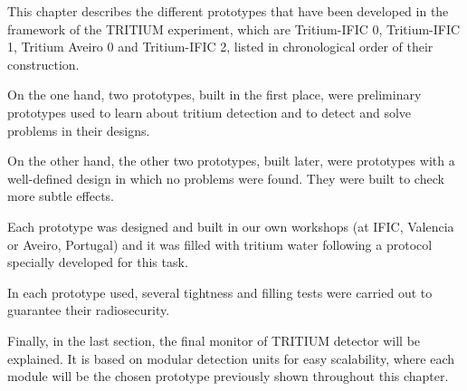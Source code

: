 This chapter describes the different prototypes that have been developed in the framework of the TRITIUM experiment, which are Tritium-IFIC 0, Tritium-IFIC 1, Tritium Aveiro 0 and Tritium-IFIC 2, listed in chronological order of their construction.

On the one hand, two prototypes, built in the first place, were preliminary prototypes used to learn about tritium detection and to detect and solve problems in their designs.

On the other hand, the other two prototypes, built later, were prototypes with a well-defined design in which no problems were found. They were built to check more subtle effects.

Each prototype was designed and built in our own workshops (at IFIC, Valencia or Aveiro, Portugal) and it was filled with tritium water following a protocol specially developed for this task.

In each prototype used, several tightness and filling tests were carried out to guarantee their radiosecurity.

Finally, in the last section, the final monitor of TRITIUM detector will be explained. It is based on modular detection units for easy scalability, where each module will be the chosen prototype previously shown throughout this chapter.